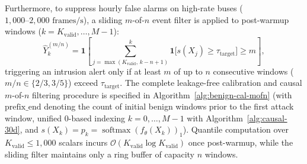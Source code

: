 \documentclass[12pt, a4paper, reqno, oneside]{book}
\begin{document}
Furthermore, to suppress hourly false alarms on high-rate buses ($1{,}000\text{--}2{,}000\text{ frames/s}$), a sliding $m$-of-$n$ event filter is applied to post-warmup windows ($k = K_{\mathrm{valid}}, \ldots, M - 1$):
\begin{equation}\label{eq:mofn-filter}
\widehat{Y}_k^{(m/n)} = \mathbf{1}\!\left[\sum_{j=\max(K_{\mathrm{valid}},\, k-n+1)}^{k} \mathbf{1}\big[s(X_j) \ge \tau_{\mathrm{target}}\big] \ge m\right],
\end{equation}
triggering an intrusion alert only if at least $m$ of up to $n$ consecutive windows ($m/n \in \{2/3, 3/5\}$) exceed $\tau_{\text{target}}$. The complete leakage-free calibration and causal $m$-of-$n$ filtering procedure is specified in Algorithm~\ref{alg:benign-cal-mofn} (with $\mathrm{prefix\_end}$ denoting the count of initial benign windows prior to the first attack window, unified 0-based indexing $k=0,\ldots,M-1$ with Algorithm~\ref{alg:causal-30d}, and $s(X_k) = p_k = \operatorname{softmax}(f_\theta(X_k))_1$). Quantile computation over $K_{\mathrm{valid}} \le 1{,}000$ scalars incurs $\mathcal{O}(K_{\mathrm{valid}}\log K_{\mathrm{valid}})$ once post-warmup, while the sliding filter maintains only a ring buffer of capacity $n$ windows.
\end{document}

